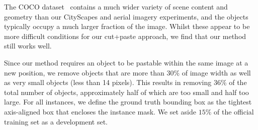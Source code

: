 \documentclass[runningheads]{llncs}
\begin{document}
The COCO dataset~\cite{lin2014microsoft} contains a much wider variety of scene content and geometry than our CityScapes and aerial imagery experiments, and the objects typically occupy a much larger fraction of the image. Whilst these appear to be more difficult conditions for our cut+paste approach, we find that our method still works well. 


Since our method requires an object to be pastable within the same image at a new position, we remove objects that are more than $30\%$ of image width as well as very small objects (less than 14 pixels). This results in removing 36\% of the total number of objects, approximately half of which are too small and half too large.
For all instances, we define the ground truth bounding box as the tightest axis-aligned box that encloses the instance mask. We set aside  $15\%$ of the official training set as a development set.
\end{document}

